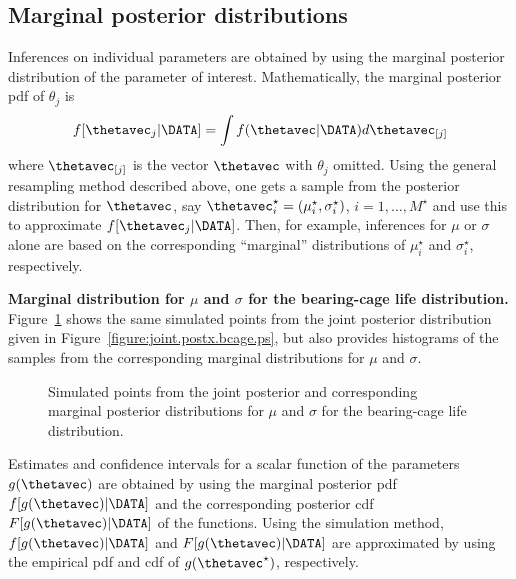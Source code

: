 \subsection{Marginal posterior distributions}
Inferences on individual parameters are obtained by
using the marginal posterior distribution of the parameter of
interest.
Mathematically, the marginal posterior pdf of $\theta_{j}$ is
\begin{displaymath}
f[\thetavec_{j} | \DATA]=
\int f( \thetavec | \DATA) d\thetavec_{[j]}
\end{displaymath}
where $\thetavec_{[j]}$ is the vector $\thetavec$ with $\theta_{j}$
omitted.  Using the general resampling method described above, one
gets a sample from the posterior distribution for $\thetavec$, say
$\thetavec_{i}^{\star}= (\mu_{i}^{\star}, \sigma_{i}^{\star})$, $i=1,
\ldots, M^{\star}$ 
and use this to approximate $f[\thetavec_{j} | \DATA]$.  Then, for
example, inferences for $\mu$ or $\sigma$ alone are based on the
corresponding ``marginal'' distributions of $\mu_{i}^{\star}$ and
$\sigma_{i}^{\star}$, respectively.

\begin{example}
{\bf Marginal distribution for  $\mu$ and $\sigma$ for the bearing-cage life
distribution.}  Figure~\ref{figure:joint.marginal.postx.bcage.ps}
shows the same simulated points from the joint posterior
distribution given in Figure~\ref{figure:joint.postx.bcage.ps}, but
also provides histograms of the samples from the corresponding
marginal distributions for $\mu$ and $\sigma$.
\begin{figure}
\caption{Simulated points from the joint posterior and 
corresponding marginal posterior distributions for $\mu$ and $\sigma$
for the bearing-cage life distribution.}
\label{figure:joint.marginal.postx.bcage.ps}
\end{figure}
\end{example}

Estimates and confidence intervals for a scalar function of the
parameters $g(\thetavec)$ are obtained by using the marginal
posterior pdf $f[g(\thetavec) | \DATA]$ and the corresponding
posterior cdf $F[g(\thetavec) | \DATA]$ of the functions.  Using the
simulation method, $f[g(\thetavec) | \DATA]$ and $F[g(\thetavec) |
\DATA]$ are approximated by using the empirical pdf and
cdf of $g(\thetavec^{\star})$, respectively.

